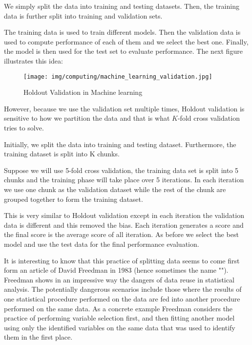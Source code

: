 	We simply split the data into training and testing datasets.  Then, the training data is further split into training and validation sets.
	
	The training data is used to train different models. Then the validation data is used to compute performance of each of them and we select the best one. Finally, the model is then used for the test set to evaluate performance. The next figure illustrates this idea:
	\begin{figure}[H]
		\centering
		\texttt{[image: img/computing/machine\_learning\_validation.jpg]}
		\caption{Holdout Validation in Machine learning}
	\end{figure}
	However, because we use the validation set multiple times, Holdout validation is sensitive to how we partition the data and that is what $K$-fold cross validation tries to solve.
	
	Initially, we split the data into training and testing dataset. Furthermore, the training dataset is split into K chunks.

	Suppose we will use 5-fold cross validation, the training data set is split into 5 chunks and the training phase will take place over 5 iterations. In each iteration we use one chunk as the validation dataset while the rest of the chunk are grouped together to form the training dataset.

	This is very similar to Holdout validation except in each iteration the validation data is different and this removed the bias. Each iteration generates a score and the final score is the average score of all iteration. As before we select the best model and use the test data for the final performance evaluation.
	
	It is interesting to know that this practice of splitting data seems to come first form an article of David Freedman \cite{freedman1983note} in 1983 (hence sometimes the name ""). Freedman shows in an impressive way the dangers of data reuse in statistical analysis. The potentially dangerous scenarios include those where the results of one statistical procedure performed on the data are fed into another procedure performed on the same data. As a concrete example Freedman considers the practice of performing variable selection first, and then fitting another model using only the identified variables on the same data that was used to identify them in the first place. 
	
